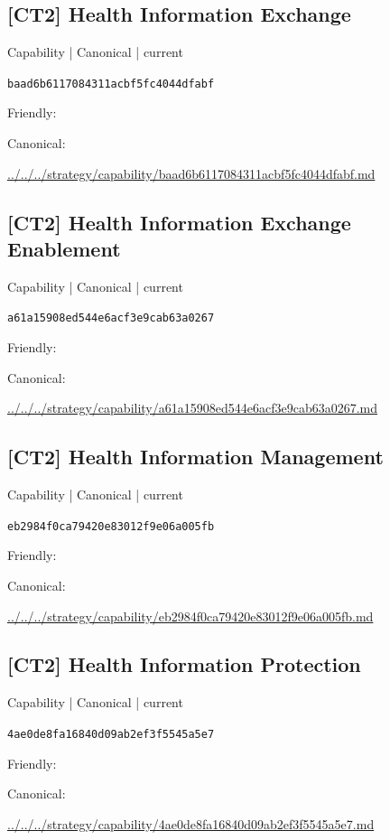 \documentclass[10pt,a4paper]{article}
\begin{document}
\subsection*{[CT2] Health Information Exchange}
{\small Capability | Canonical | current}\par
\texttt{baad6b6117084311acbf5fc4044dfabf}\par
Friendly: \par
Canonical: \par
{\footnotesize\url{../../../strategy/capability/baad6b6117084311acbf5fc4044dfabf.md}}\par
\subsection*{[CT2] Health Information Exchange Enablement}
{\small Capability | Canonical | current}\par
\texttt{a61a15908ed544e6acf3e9cab63a0267}\par
Friendly: \par
Canonical: \par
{\footnotesize\url{../../../strategy/capability/a61a15908ed544e6acf3e9cab63a0267.md}}\par
\subsection*{[CT2] Health Information Management}
{\small Capability | Canonical | current}\par
\texttt{eb2984f0ca79420e83012f9e06a005fb}\par
Friendly: \par
Canonical: \par
{\footnotesize\url{../../../strategy/capability/eb2984f0ca79420e83012f9e06a005fb.md}}\par
\subsection*{[CT2] Health Information Protection}
{\small Capability | Canonical | current}\par
\texttt{4ae0de8fa16840d09ab2ef3f5545a5e7}\par
Friendly: \par
Canonical: \par
{\footnotesize\url{../../../strategy/capability/4ae0de8fa16840d09ab2ef3f5545a5e7.md}}\par
\end{document}
